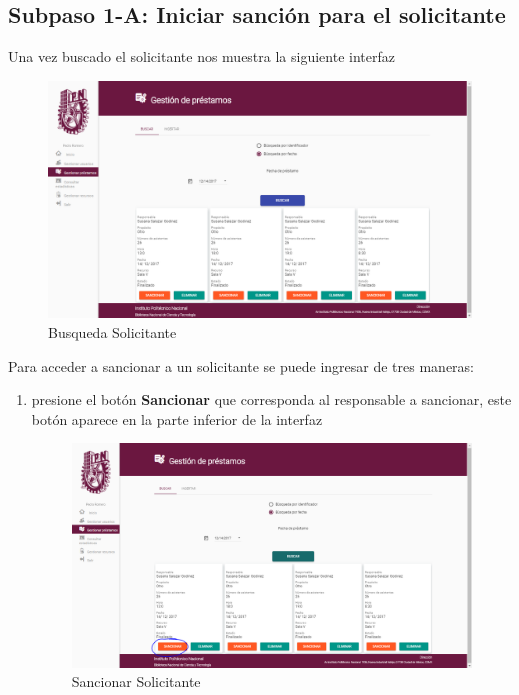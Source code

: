 \subsection{Subpaso 1-A: Iniciar sanción para el solicitante}
Una vez buscado el solicitante nos muestra la siguiente interfaz
\begin{figure}[hbtp]

	\includegraphics[scale=0.3]{images/Interfaz/IUGS07_busqueda.PNG}
	\caption{Busqueda Solicitante}
	\end{figure}

	Para acceder a sancionar a un solicitante se puede ingresar de tres maneras:
	\begin{enumerate}
		\item presione el botón \textbf{Sancionar} que corresponda 
			al responsable a sancionar, este botón aparece en la parte 
			inferior de la interfaz
		\begin{figure}[hbtp]

	\includegraphics[scale=0.3]{images/Interfaz/IUGS07_sancionarBoton.PNG}
	\caption{Sancionar Solicitante}
	\end{figure}	 
		
	\end{enumerate}

	